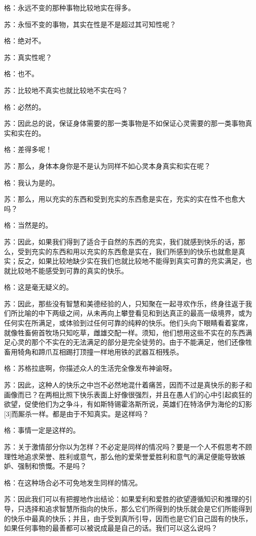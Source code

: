 \documentclass[12pt,oneside]{book}
\begin{document}
格：永远不变的那种事物比较地实在得多。

苏：永恒不变的事物，其实在性是不是超过其可知性呢？

格：绝对不。

苏：真实性呢？

格：也不。

苏：比较地不真实也就比较地不实在吗？

格：必然的。

苏：因此总的说，保证身体需要的那一类事物是不如保证心灵需要的那一类事物真实和实在的。

格：差得多呢！

苏：那么，身体本身你是不是认为同样不如心灵本身真实和实在呢？

格：我认为是的。

苏：那么，用以充实的东西和受到充实的东西愈是实在，充实的实在性不也愈大吗？

格：当然是的。

苏：因此，如果我们得到了适合于自然的东西的充实，我们就感到快乐的话，那么，受到充实的东西和用以充实的东西愈是实在，我们所感到的快乐也就愈是真实；反之，如果比较地缺少实在我们也就比较地不能得到真实可靠的充实满足，也就比较地不能感受到可靠的真实的快乐。

格：这是毫无疑义的。

苏：因此，那些没有智慧和美德经验的人，只知聚在一起寻欢作乐，终身往返于我们所比喻的中下两级之间，从未再向上攀登看见和到达真正的最高一级境界，或为任何实在所满足，或体验到过任何可靠的纯粹的快乐。他们头向下眼睛看着宴席，就像牲畜俯首牧场只知吃草，雌雄交配一样。须知，他们想用这些不实在的东西满足心灵的那个不实在的无法满足的部分是完全徒劳的。由于不能满足，他们还像牲畜用犄角和蹄爪互相踢打顶撞一样地用铁的武器互相残杀。

格：苏格拉底啊，你描述众人的生活完全像发布神谕呀。

苏：因此，这种人的快乐之中岂不必然地混什着痛苦，因而不过是真快乐的影子和画像而已？在两相比照下快乐表面上好像很强烈，并且在愚人们的心中引起疯狂的欲望，促使他们为之争斗，有如斯特锡霍洛斯所说，英雄们在特洛伊为海伦的幻影[3]而厮杀一样。都是由于不知真实。是这样吗？

格：事情一定是这样的。

苏：关于激情部分你以为怎样？不必定是同样的情况吗？要是一个人不假思考不顾理性地追求荣誉、胜利或意气，那么他的爱荣誉爱胜利和意气的满足便能导致嫉妒、强制和愤慨。不是吗？

格：在这种场合必不可免地发生同样的情况。

苏：因此我们可以有把握地作出结论：如果爱利和爱胜的欲望遵循知识和推理的引导，只选择和追求智慧所指向的快乐，那么它们所得到的快乐就会是它们所能得到的快乐中最真的快乐；并且，由于受到真所引导，因而也是它们自己固有的快乐，如果任何事物的最善都可以被说成最是自己的话。我们可以这么说吗？
\end{document}
